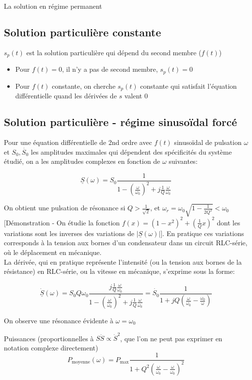 \documentclass[openany]{book}
\begin{document}
La solution en régime permanent

\subsection{Solution particulière constante}
$ s_p(t) $ est la solution particulière qui dépend du second membre ($f(t)$)
\begin{itemize}
    \item Pour $f(t)=0$, il n'y a pas de second membre, $s_p(t)=0$
    \item Pour $f(t)$ constante, on cherche $s_p(t)$ constante qui satisfait l'équation différentielle quand les dérivées de $s$ valent $0$
\end{itemize}

\subsection{Solution particulière - régime sinusoïdal forcé}
Pour une équation différentielle de 2nd ordre avec $f(t)$ sinusoïdal de pulsation $\omega$ et $S_0, \dot{S_0}$ les amplitudes maximales qui dépendent des spécificités du système étudié, on a les amplitudes complexes en fonction de $ \omega $ suivantes:

\[ \underline{S}(\omega) = S_0 \frac{1}{1-(\frac{\omega}{\omega_0})^2+j\frac{1}{Q}\frac{\omega}{\omega_0}} \]

\noindent On obtient une pulsation de résonance si $ Q > \frac{1}{\sqrt{2}} $, et $ \omega_r = \omega_0 \sqrt{1-\frac{1}{2Q^2}} < \omega_0 $ [Démonstration - On étudie la fonction $ f(x) = (1-x^2)^2 + (\frac{1}{Q}x)^2 $ dont les variations sont les inverses des variations de $|\underline{S}(\omega)|$]. En pratique ces variations corresponds à la tension aux bornes d'un condensateur dans un circuit RLC-série, où le déplacement en mécanique. \\

\noindent La dérivée, qui en pratique représente l'intensité (ou la tension aux bornes de la résistance) en RLC-série, ou la vitesse en mécanique, s'exprime sous la forme:

\[ \underline{\dot{S}}(\omega) = S_0 Q \omega_0\frac{j \frac{1}{Q} \frac{\omega}{\omega_0}}{1-(\frac{\omega}{\omega_0})^2+j\frac{1}{Q}\frac{\omega}{\omega_0}} = \dot{S_0} \frac{1}{1+jQ(\frac{\omega}{\omega_0} - \frac{\omega_0}{\omega})} \]

\noindent On observe une résonance évidente à $ \omega = \omega_0 $
    
\noindent Puissances (proportionnelles à $S\dot{S} \propto \dot{S}^2$, que l'on ne peut pas exprimer en notation complexe directement) 
\[ P_{\text{moyenne}}(\omega) = P_{\text{max}} \frac{1}{1+Q^2(\frac{\omega}{\omega_0}-\frac{\omega}{\omega_0})^2} \]
\end{document}
